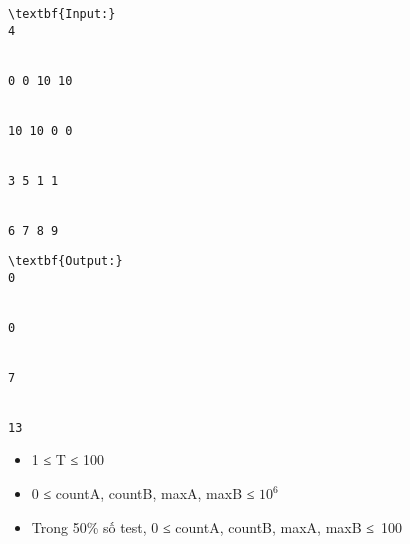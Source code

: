 \begin{verbatim}
\textbf{Input:}
4


0 0 10 10


10 10 0 0


3 5 1 1


6 7 8 9 \end{verbatim}
\begin{verbatim}
\textbf{Output:}
0


0


7


13 \end{verbatim}
\begin{itemize}
	\item     1 ≤ T ≤ 100   
	\item     0 ≤ countA, countB, maxA, maxB ≤ $10^{6}$
	\item     Trong 50\% số test, 0 ≤ countA, countB, maxA, maxB ≤ 100   
\end{itemize}